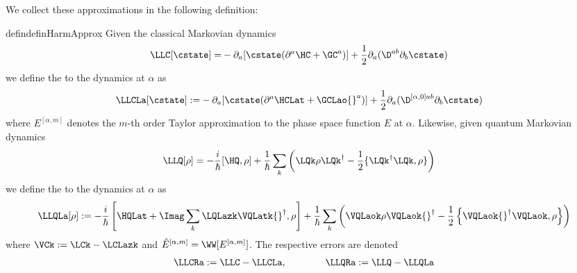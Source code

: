 \documentclass{article}
\numberwithin{equation}{section}
\begin{document}
We collect these approximations in the following definition:
\begin{restatable}{defin}{definHarmApprox}
	\label{def:harmonic-approx}
	Given the classical Markovian dynamics
	\begin{align}\label{eq:fokker-planck-exact-2}
		\LLC [\cstate] =& -\partial_a [\cstate (\partial^a \HC + \GC^a) ]  +	\frac{1}{2} \partial_a (\D^{ab} \partial_b \cstate)
	\end{align}
	we define the  to the dynamics at $\alpha$ as
	\begin{align}\label{eq:fokker-planck-harmonic-2}
		\LLCLa [\cstate]
		:=& -\partial_a [\cstate (\partial^a \HCLat + \GCLao{}^{a}) ]
		+ \frac{1}{2}  \partial_a (\D^{[\alpha,0]ab} \partial_b \cstate)
	\end{align}
	where $E^{[\alpha,m]}$ denotes the $m$-th order Taylor approximation to the phase space function $E$ at $\alpha$.  Likewise, given quantum Markovian dynamics
	\begin{align}\label{eq:quantum-dynamics-exact-2}
		\LLQ[\rho] & = -\frac{i}{\hbar}[\HQ,\rho] + \frac{1}{\hbar} \sum_k \left( \LQk \rho \LQk^\dagger - \frac{1}{2} \{ \LQk^\dagger \LQk,\rho\} \right)
	\end{align}
	we define the  to the dynamics at $\alpha$ as
	\begin{align}
		\LLQLa [\rho]
		& := -\frac{i}{\hbar}\left[\HQLat+ \Imag\sum_k \LQLazk \VQLatk{}^\dagger,\rho\right] + \frac{1}{\hbar} \sum_k \left( \VQLaok \rho \VQLaok{}^\dagger - \frac{1}{2} \left\{ \VQLaok{}^\dagger \VQLaok,\rho\right\} \right) \\
	\end{align}
	where $\VCk:=\LCk-\LCLazk$ and $\hat{E}^{[\alpha,m]} = \WW[E^{[\alpha,m]}]$. 
    The respective errors are denoted
    \begin{align}
	\LLCRa := \LLC - \LLCLa,\qquad \qquad
        \LLQRa := \LLQ - \LLQLa
    \end{align}
\end{restatable}
\end{document}
